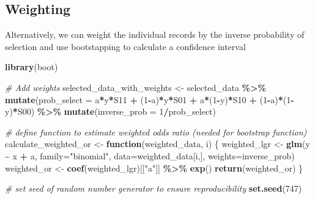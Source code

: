 \documentclass[
]{book}
\newenvironment{Shaded}{\begin{snugshade}}{\end{snugshade}}
\newcommand{\AttributeTok}[1]{\textcolor[rgb]{0.13,0.29,0.53}{#1}}
\newcommand{\CommentTok}[1]{\textcolor[rgb]{0.56,0.35,0.01}{\textit{#1}}}
\newcommand{\ControlFlowTok}[1]{\textcolor[rgb]{0.13,0.29,0.53}{\textbf{#1}}}
\newcommand{\DecValTok}[1]{\textcolor[rgb]{0.00,0.00,0.81}{#1}}
\newcommand{\FunctionTok}[1]{\textcolor[rgb]{0.13,0.29,0.53}{\textbf{#1}}}
\newcommand{\NormalTok}[1]{#1}
\newcommand{\OtherTok}[1]{\textcolor[rgb]{0.56,0.35,0.01}{#1}}
\newcommand{\SpecialCharTok}[1]{\textcolor[rgb]{0.81,0.36,0.00}{\textbf{#1}}}
\newcommand{\StringTok}[1]{\textcolor[rgb]{0.31,0.60,0.02}{#1}}
\begin{document}
\hypertarget{weighting}{%
\subsection{Weighting}\label{weighting}}

Alternatively, we can weight the individual records by the inverse probability of selection and use bootstapping to calculate a confidence interval

\begin{Shaded}
\begin{Highlighting}[]
\FunctionTok{library}\NormalTok{(boot)}

\CommentTok{\# Add weights}
\NormalTok{selected\_data\_with\_weights }\OtherTok{\textless{}{-}}\NormalTok{ selected\_data }\SpecialCharTok{\%\textgreater{}\%} 
  \FunctionTok{mutate}\NormalTok{(}\AttributeTok{prob\_select =}\NormalTok{ a}\SpecialCharTok{*}\NormalTok{y}\SpecialCharTok{*}\NormalTok{S11 }\SpecialCharTok{+}\NormalTok{ (}\DecValTok{1}\SpecialCharTok{{-}}\NormalTok{a)}\SpecialCharTok{*}\NormalTok{y}\SpecialCharTok{*}\NormalTok{S01 }\SpecialCharTok{+}\NormalTok{ a}\SpecialCharTok{*}\NormalTok{(}\DecValTok{1}\SpecialCharTok{{-}}\NormalTok{y)}\SpecialCharTok{*}\NormalTok{S10 }\SpecialCharTok{+}\NormalTok{ (}\DecValTok{1}\SpecialCharTok{{-}}\NormalTok{a)}\SpecialCharTok{*}\NormalTok{(}\DecValTok{1}\SpecialCharTok{{-}}\NormalTok{y)}\SpecialCharTok{*}\NormalTok{S00) }\SpecialCharTok{\%\textgreater{}\%}
  \FunctionTok{mutate}\NormalTok{(}\AttributeTok{inverse\_prob =} \DecValTok{1}\SpecialCharTok{/}\NormalTok{prob\_select) }

\CommentTok{\# define function to estimate weighted odds ratio (needed for bootstrap function)}
\NormalTok{calculate\_weighted\_or }\OtherTok{\textless{}{-}} \ControlFlowTok{function}\NormalTok{(weighted\_data, i) \{}
\NormalTok{  weighted\_lgr }\OtherTok{\textless{}{-}} \FunctionTok{glm}\NormalTok{(y }\SpecialCharTok{\textasciitilde{}}\NormalTok{ x }\SpecialCharTok{+}\NormalTok{ a, }\AttributeTok{family=}\StringTok{"binomial"}\NormalTok{, }\AttributeTok{data=}\NormalTok{weighted\_data[i,], }\AttributeTok{weights=}\NormalTok{inverse\_prob) }
\NormalTok{  weighted\_or }\OtherTok{\textless{}{-}} \FunctionTok{coef}\NormalTok{(weighted\_lgr)[[}\StringTok{"a"}\NormalTok{]] }\SpecialCharTok{\%\textgreater{}\%} \FunctionTok{exp}\NormalTok{()}
  \FunctionTok{return}\NormalTok{(weighted\_or)}
\NormalTok{\}}

\CommentTok{\# set seed of random number generator to ensure reproducibility}
\FunctionTok{set.seed}\NormalTok{(}\DecValTok{747}\NormalTok{)}


\end{Highlighting}
\end{Shaded}
\end{document}
